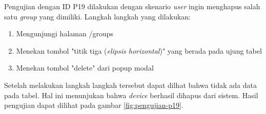 Pengujian dengan ID P19 dilakukan dengan skenario \textit{user} ingin menghapus salah satu \textit{group} yang dimiliki. Langkah langkah yang dilakukan:
\begin{enumerate}
  \item Mengunjungi halaman /groups
  \item Menekan tombol "titik tiga (\textit{elipsis horizontal})" yang berada pada ujung tabel
  \item Menekan tombol "delete" dari popup modal
\end{enumerate}

Setelah melakukan langkah langkah tersebut dapat dilhat bahwa tidak ada data pada tabel. Hal ini menunjukan bahwa \textit{device} berhasil dihapus dari sistem. Hasil pengujian dapat dilihat pada gambar \ref{fig:pengujian-p19}.